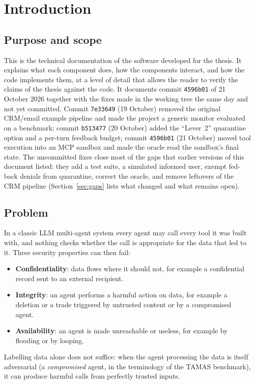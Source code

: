 \documentclass[11pt,a4paper]{article}
\DeclareRobustCommand{\code}[1]{{\renewcommand{\_}{\textunderscore\allowbreak}\texttt{#1}}}
\begin{document}
\tableofcontents
\newpage

\section{Introduction}
\label{sec:intro}

\subsection{Purpose and scope}

This is the technical documentation of the software developed for the thesis. It
explains what each component does, how the components interact, and how the code
implements them, at a level of detail that allows the reader to verify the claims of
the thesis against the code. It documents commit \code{4596b01} of 21 October 2026
together with the fixes made in the working tree the same day and not yet committed.
Commit \code{7e33649} (19 October) removed the original CRM/email example pipeline and
made the project a generic monitor evaluated on a benchmark; commit \code{b513477}
(20 October) added the ``Lever~2'' quarantine option and a per-turn feedback budget;
commit \code{4596b01} (21 October) moved tool execution into an MCP sandbox and made the
oracle read the sandbox's final state. The uncommitted fixes close most of the gaps that
earlier versions of this document listed: they add a test suite, a simulated informed
user, exempt fed-back denials from quarantine, correct the oracle, and remove leftovers
of the CRM pipeline (Section~\ref{sec:gaps} lists what changed and what remains open).

\subsection{Problem}

In a classic LLM multi-agent system every agent may call every tool it was built with,
and nothing checks whether the call is appropriate for the data that led to it. Three
security properties can then fail:
\begin{itemize}
  \item \textbf{Confidentiality}: data flows where it should not, for example a
        confidential record sent to an external recipient.
  \item \textbf{Integrity}: an agent performs a harmful action on data, for example
        a deletion or a trade triggered by untrusted content or by a compromised agent.
  \item \textbf{Availability}: an agent is made unreachable or useless, for example by
        flooding or by looping.
\end{itemize}
Labelling data alone does not suffice: when the agent processing the data is itself
adversarial (a \emph{compromised} agent, in the terminology of the TAMAS benchmark),
it can produce harmful calls from perfectly trusted inputs.
\end{document}
